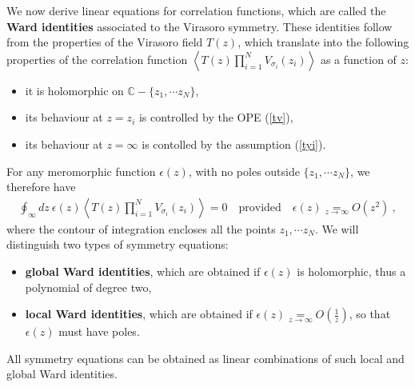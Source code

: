 \documentclass[12pt,a4paper,notitlepage]{report}
\newcommand \la {\left\langle}
\newcommand \ra {\right\rangle}
\newcommand \C {\mathbb{C}}
\numberwithin{equation}{section}
\theoremstyle{break}
\begin{document}
We now derive linear equations for correlation functions, which are called the \textbf{\boldmath Ward identities} associated to the Virasoro symmetry. These identities follow from the properties of the Virasoro field $T(z)$, which translate into the following properties of the correlation function $\la T(z)\prod_{i=1}^N V_{\sigma_i}(z_i) \ra$ as a function of $z$:
\begin{itemize}
 \item it is holomorphic on $\C-\{z_1,\cdots z_N\}$,
\item its behaviour at $z=z_i$ is controlled by the OPE (\ref{tv}),
\item its behaviour at $z=\infty$ is contolled by the assumption (\ref{tyi}).
\end{itemize}
For any meromorphic function $\epsilon(z)$, with no poles outside $\{z_1,\cdots z_N\}$, we therefore have
\begin{align}
 \oint_\infty dz\ \epsilon(z) \la T(z)\prod_{i=1}^N V_{\sigma_i}(z_i) \ra = 0 \quad \text{provided} \quad \epsilon(z)\underset{z\rightarrow\infty}{=} O(z^2)\ ,
\label{oiz}
\end{align}
where the contour of integration encloses all the points $z_1,\cdots z_N$.
We will distinguish two types of symmetry equations:
\begin{itemize}
 \item \textbf{\boldmath global Ward identities}, which are obtained if $\epsilon(z)$ is holomorphic, thus a polynomial of degree two, 
\item \textbf{\boldmath local Ward identities}, which are obtained if $\epsilon(z) \underset{z\rightarrow\infty}{=} O(\frac{1}{z})$, so that $\epsilon(z)$ must have poles.
\end{itemize}
All symmetry equations can be obtained as linear combinations of such local and global Ward identities.
\end{document}
